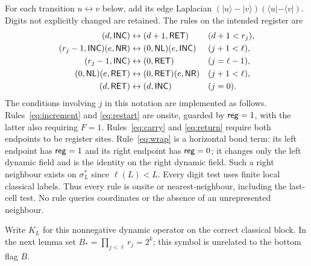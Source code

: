 For each transition $u\leftrightarrow v$ below, add its edge Laplacian
$(|u\rangle-|v\rangle)(\langle u|-\langle v|)$. Digits not explicitly
changed are retained. The rules on the intended register are
\begin{align}
 (d,\mathsf{INC})&\leftrightarrow(d+1,\mathsf{RET})
              &&(d+1<r_j),\label{eq:increment}\\
 (r_j-1,\mathsf{INC})(e,\mathsf{NR})&\leftrightarrow(0,\mathsf{NL})(e,\mathsf{INC})
              &&(j+1<\ell),\label{eq:carry}\\
 (r_j-1,\mathsf{INC})&\leftrightarrow(0,\mathsf{RET})
              &&(j=\ell-1),\label{eq:wrap}\\
 (0,\mathsf{NL})(e,\mathsf{RET})&\leftrightarrow(0,\mathsf{RET})(e,\mathsf{NR})
              &&(j+1<\ell),\label{eq:return}\\
 (d,\mathsf{RET})&\leftrightarrow(d,\mathsf{INC})
              &&(j=0).\label{eq:restart}
\end{align}
The conditions involving $j$ in this notation are implemented as follows.
Rules~\eqref{eq:increment} and \eqref{eq:restart} are onsite, guarded by
$\mathsf{reg}=1$, with the latter also requiring $F=1$.
Rules~\eqref{eq:carry} and \eqref{eq:return} require both endpoints to be
register sites. Rule~\eqref{eq:wrap} is a horizontal bond term: its left
endpoint has $\mathsf{reg}=1$ and its right endpoint has $\mathsf{reg}=0$; it changes
only the left dynamic field and is the identity on the right dynamic
field. Such a right neighbour exists on $\sigma_L^*$ since $\ell(L)<L$.
Every digit test uses finite local classical labels. Thus every rule is
onsite or nearest-neighbour, including the last-cell test. No rule queries
coordinates or the absence of an unrepresented neighbour.

Write $K_L$ for this nonnegative dynamic operator on the correct classical
block. In the next lemma set $B_* =\prod_{j<\ell}r_j=2^k$; this symbol
is unrelated to the bottom flag $B$.

